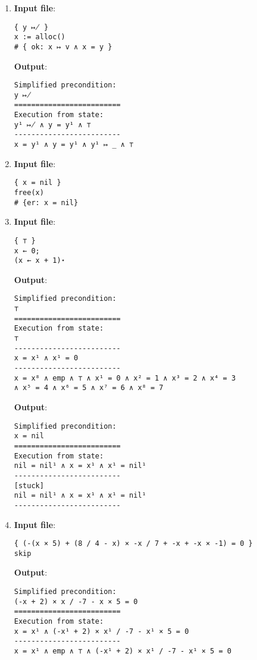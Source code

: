 \documentclass[parskip=half]{scrartcl}
\begin{document}
\begin{enumerate}
\item 
\textbf{Input file}: 
\begin{verbatim}
{ y ↦̸ }
x := alloc()
# { ok: x ↦ v ∧ x = y }
\end{verbatim}

\textbf{Output}: 
\begin{verbatim}
Simplified precondition:
y ↦̸
=========================
Execution from state:
y¹ ↦̸ ∧ y = y¹ ∧ ⊤
-------------------------
x = y¹ ∧ y = y¹ ∧ y¹ ↦ _ ∧ ⊤
\end{verbatim}

\item 
\textbf{Input file}: 
\begin{verbatim}
{ x = nil }
free(x)
# {er: x = nil}
\end{verbatim}

\item 
\textbf{Input file}: 
\begin{verbatim}
{ ⊤ }
x ← 0;
(x ← x + 1)⋆
\end{verbatim}

\textbf{Output}: 
\begin{verbatim}
Simplified precondition:
⊤
=========================
Execution from state:
⊤
-------------------------
x = x¹ ∧ x¹ = 0
-------------------------
x = x⁸ ∧ emp ∧ ⊤ ∧ x¹ = 0 ∧ x² = 1 ∧ x³ = 2 ∧ x⁴ = 3 
∧ x⁵ = 4 ∧ x⁶ = 5 ∧ x⁷ = 6 ∧ x⁸ = 7
\end{verbatim}

\textbf{Output}: 
\begin{verbatim}
Simplified precondition:
x = nil
=========================
Execution from state:
nil = nil¹ ∧ x = x¹ ∧ x¹ = nil¹
-------------------------
[stuck]
nil = nil¹ ∧ x = x¹ ∧ x¹ = nil¹
-------------------------
\end{verbatim}

\item 
\textbf{Input file}: 
\begin{verbatim}
{ (-(x × 5) + (8 / 4 - x) × -x / 7 + -x + -x × -1) = 0 }
skip
\end{verbatim}

\textbf{Output}: 
\begin{verbatim}
Simplified precondition:
(-x + 2) × x / -7 - x × 5 = 0
=========================
Execution from state:
x = x¹ ∧ (-x¹ + 2) × x¹ / -7 - x¹ × 5 = 0
-------------------------
x = x¹ ∧ emp ∧ ⊤ ∧ (-x¹ + 2) × x¹ / -7 - x¹ × 5 = 0
\end{verbatim}

\end{enumerate}
\end{document}
